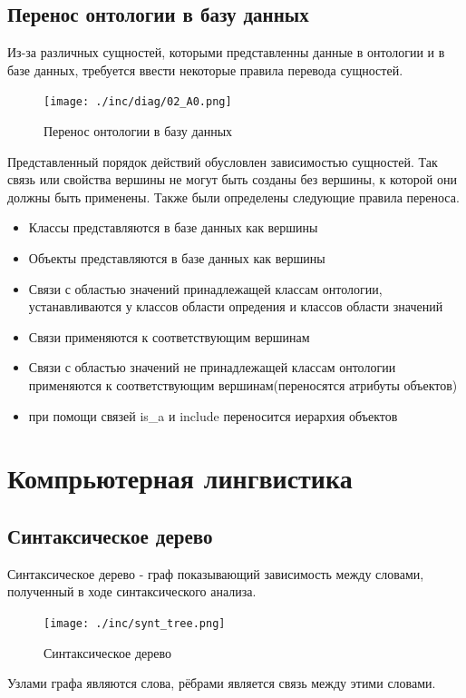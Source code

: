 \subsection{Перенос онтологии в базу данных}
Из-за различных сущностей, которыми представленны данные в онтологии и в базе данных, требуется ввести некоторые правила перевода сущностей.
\begin{center}
\begin{figure}[!h]
  \centering
  \texttt{[image: ./inc/diag/02\_A0.png]}
  \caption{Перенос онтологии в базу данных}
  \label{fig:fig01}
\end{figure}
\end{center}
Представленный порядок действий обусловлен зависимостью сущностей. Так связь или свойства вершины не могут быть созданы без вершины, к которой они должны быть применены. 
Также были определены следующие правила переноса. 
\begin{itemize}
\item Классы представляются в базе данных как вершины
\item Объекты представляются в базе данных как вершины
\item Связи с областью значений принадлежащей классам онтологии, устанавливаются у классов области опредения и классов области значений
\item Связи применяются к соответствующим вершинам
\item Связи с областью значений не принадлежащей классам онтологии применяются к соответствующим вершинам(переносятся атрибуты объектов)
\item при помощи связей is\_a и include переносится иерархия объектов 
\end{itemize}
\section{Компрьютерная лингвистика}
\subsection{Синтаксическое дерево}
Синтаксическое дерево - граф показывающий зависимость между словами, полученный в ходе синтаксического анализа. 
\begin{figure}[!h]
  \centering
  \texttt{[image: ./inc/synt\_tree.png]}
  \caption{Синтаксическое дерево}
  \label{fig:fig04}
\end{figure}
Узлами графа являются слова, рёбрами является связь между этими словами.
